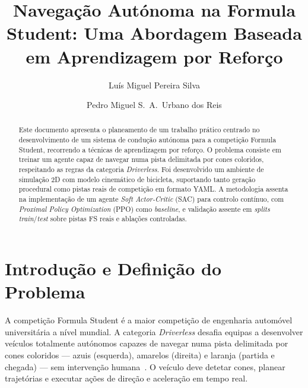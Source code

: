 \documentclass[runningheads]{llncs}
\begin{document}
\sloppy

\title{Navegação Autónoma na Formula Student: Uma Abordagem Baseada em Aprendizagem por Reforço}

\author{Luís Miguel Pereira Silva \and
Pedro Miguel S.\ A.\ Urbano dos Reis}



\maketitle

\begin{abstract}
Este documento apresenta o planeamento de um trabalho prático centrado no desenvolvimento de um sistema de condução autónoma para a competição Formula Student, recorrendo a técnicas de aprendizagem por reforço. O problema consiste em treinar um agente capaz de navegar numa pista delimitada por cones coloridos, respeitando as regras da categoria \textit{Driverless}. Foi desenvolvido um ambiente de simulação 2D com modelo cinemático de bicicleta, suportando tanto geração procedural como pistas reais de competição em formato YAML. A metodologia assenta na implementação de um agente \textit{Soft Actor-Critic} (SAC) para controlo contínuo, com \textit{Proximal Policy Optimization} (PPO) como \textit{baseline}, e validação assente em \textit{splits} \textit{train}/\textit{test} sobre pistas FS reais e ablações controladas.

\end{abstract}

\section{Introdução e Definição do Problema}

A competição Formula Student é a maior competição de engenharia automóvel universitária a nível mundial. A categoria \textit{Driverless} desafia equipas a desenvolver veículos totalmente autónomos capazes de navegar numa pista delimitada por cones coloridos --- azuis (esquerda), amarelos (direita) e laranja (partida e chegada) --- sem intervenção humana~\cite{kabzan2020}. O veículo deve detetar cones, planear trajetórias e executar ações de direção e aceleração em tempo real.
\end{document}
